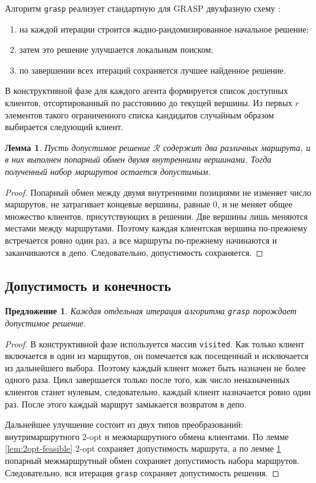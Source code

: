 \documentclass[a4paper,12pt]{article}
\newtheorem{lemma}{Лемма}[section]
\newtheorem{proposition}{Предложение}[section]
\begin{document}
Алгоритм \texttt{grasp} реализует стандартную для GRASP двухфазную схему
\cite{feo1995}:
\begin{enumerate}[label=\arabic*.]
  \item на каждой итерации строится жадно-рандомизированное начальное решение;
  \item затем это решение улучшается локальным поиском;
  \item по завершении всех итераций сохраняется лучшее найденное решение.
\end{enumerate}

В конструктивной фазе для каждого агента формируется список доступных клиентов,
отсортированный по расстоянию до текущей вершины. Из первых \(r\) элементов такого
ограниченного списка кандидатов случайным образом выбирается следующий клиент.

\begin{lemma}\label{lem:swap-feasible}
Пусть допустимое решение \(\mathcal{R}\) содержит два различных маршрута, и в них
выполнен попарный обмен двумя внутренними вершинами. Тогда полученный набор маршрутов
остается допустимым.
\end{lemma}

\begin{proof}
Попарный обмен между двумя внутренними позициями не изменяет число маршрутов, не затрагивает
концевые вершины, равные \(0\), и не меняет общее множество клиентов, присутствующих в
решении. Две вершины лишь меняются местами между маршрутами. Поэтому каждая клиентская
вершина по-прежнему встречается ровно один раз, а все маршруты по-прежнему начинаются и
заканчиваются в депо. Следовательно, допустимость сохраняется.
\end{proof}

\subsection{Допустимость и конечность}

\begin{proposition}
Каждая отдельная итерация алгоритма \texttt{grasp} порождает допустимое решение.
\end{proposition}

\begin{proof}
В конструктивной фазе используется массив \texttt{visited}. Как только клиент включается в
один из маршрутов, он помечается как посещенный и исключается из дальнейшего выбора. Поэтому
каждый клиент может быть назначен не более одного раза. Цикл завершается только после того,
как число неназначенных клиентов станет нулевым, следовательно, каждый клиент назначается
ровно один раз. После этого каждый маршрут замыкается возвратом в депо.

Дальнейшее улучшение состоит из двух типов преобразований: внутримаршрутного 2-opt и
межмаршрутного обмена клиентами. По лемме \ref{lem:2opt-feasible} 2-opt сохраняет
допустимость маршрута, а по лемме \ref{lem:swap-feasible} попарный межмаршрутный обмен
сохраняет допустимость набора маршрутов. Следовательно, вся итерация \texttt{grasp}
сохраняет допустимость решения.
\end{proof}
\end{document}
